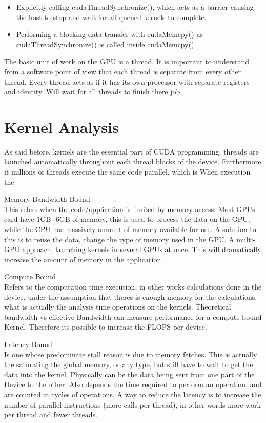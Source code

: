 \begin{itemize}
  \item Explicitly calling cudaThreadSynchronize(), which acts as a barrier causing the host to stop and wait for all queued kernels to complete.
  \item Performing a blocking data transfer with cudaMemcpy() as cudaThreadSynchronize() is called inside cudaMemcpy().
\end{itemize}

The basic unit of work on the GPU is a thread. It is important to understand from a software point of view that each thread is separate from every other thread. Every thread acts as if it has its own processor with separate registers and identity. Will wait for all threads to finish there job. \cite{design}

\section{Kernel Analysis}

As said before, kernels are the essential part of CUDA programming, threads are launched automatically throughout each thread blocks of the device. Furthermore it millions of threads execute the same code parallel, which is  When execution the 

\begin{description}

 \item{Memory Bandwidth Bound} \hfill \\
 This refers when the code/application is limited by memory access. Most GPUs card have 1GB- 6GB of memory, this is used to process the data on the GPU, while the CPU has massively amount of memory available for use. A solution to this is to reuse the data, change the type of memory used in the GPU. A multi-GPU approach, launching kernels in several GPUs at once. This will dramatically increase the amount of memory in the application.

  \item{Compute Bound} \hfill \\
Refers to the computation time execution, in other works calculations done in the device, under the assumption that  theres is enough memory for the calculations. what is actually the analysis time operations on the kernels. Theoretical bandwidth vs  effective Bandwidth can measure performance for a compute-bound Kernel. Therefore its possible to increase the FLOPS per device.

 \item{Latency Bound} \hfill \\
 Is one whose predominate stall reason is due to memory fetches. This is actually the saturating the global memory, or any type, but still have to wait to get the data into the kernel. Physically can be the data being sent from one part of the Device to the other. Also depends the time required to perform an operation, and are counted in cycles of operations. A way to reduce the latency is to increase the number of parallel instructions (more  calls per thread), in other words more work per thread and fewer threads.
 \end{description}

